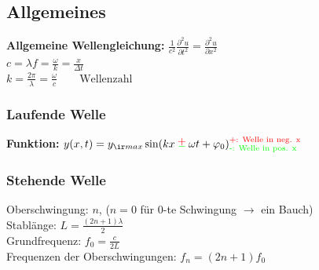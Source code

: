 \begin{sectionbox}
    \subsection{Allgemeines}
    \textbf{Allgemeine Wellengleichung:} $\frac{1}{c^2}\frac{\partial^2u}{\partial t^2}=\frac{\partial^2u}{\partial x^2}$\\

    $c=\lambda   f=\frac{\omega}{k}=\frac{x}{\Delta t}$\\
    $k=\frac{2\pi}{\lambda}=\frac{\omega}{c} \qquad \text{Wellenzahl}$ \\

    \subsubsection{Laufende Welle}
    \begin{emphbox}
        \textbf{Funktion:} $y(x,t)=y_{\ir max}\sin(kx \cpm \omega t + \varphi_0)^{\textcolor{red}{\text{+: Welle in neg. x}}}_{\textcolor{green}{\text{-: Welle in pos. x}}}$
    \end{emphbox}

    \subsubsection{Stehende Welle}
    Oberschwingung: $n$, ($n=0$ für $0$-te Schwingung $\rightarrow$ ein Bauch) \\
    Stablänge: $L=\frac{(2n+1)\lambda}{2}$ \\
    Grundfrequenz: $f_0=\frac{c}{2L}$ \\
    Frequenzen der Oberschwingungen: $f_n=(2n+1)f_0$
\end{sectionbox}


